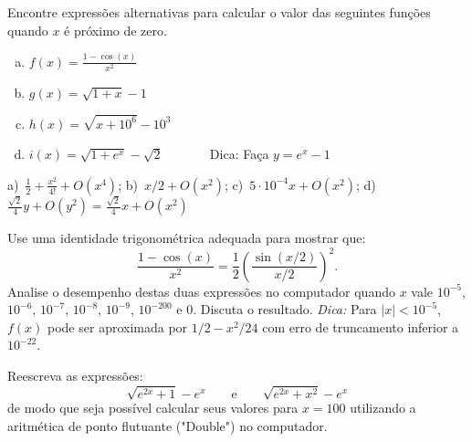 \begin{exer} Encontre expressões alternativas para calcular o valor das seguintes funções quando $x$ é próximo de zero.
\begin{enumerate}[a)]
\item $f(x)=\frac{1-\cos(x)}{x^2}$
\item $g(x)=\sqrt{1+x}-1$
\item $h(x)=\sqrt{x+10^6}-10^3$
\item $i(x)=\sqrt{1+e^{x}}-\sqrt{2}$ ~~~~~~ Dica: Faça $y=e^{x}-1$
\end{enumerate}
\end{exer}
\begin{resp}
    a)~$\frac{1}{2}+\frac{x^2}{4!}+O(x^4)$; b)~$x/2+O(x^2)$; c)~$5\cdot 10^{-4}x+O(x^2)$; d)~$\frac{\sqrt{2}}{4}y+O(y^{2})=\frac{\sqrt{2}}{4}x+O(x^2)$
\end{resp}

\begin{exer} Use uma identidade trigonométrica adequada para mostrar que:
  \begin{equation*}
    \frac{1-\cos(x)}{x^2}= \frac{1}{2} \left(\frac{\sin(x/2)}{x/2}\right)^2.
  \end{equation*}
Analise o desempenho destas duas expressões no computador quando $x$ vale $10^{-5}$, $10^{-6}$, $10^{-7}$, $10^{-8}$, $10^{-9}$, $10^{-200}$ e $0$. Discuta o resultado.
\emph{Dica:} Para $|x|<10^{-5}$, $f(x)$ pode ser aproximada por $1/2-x^2/24$ com erro de truncamento inferior a $10^{-22}$.
\end{exer}



\begin{exer} Reescreva as expressões:
  $$\sqrt{e^{2x}+1}-e^x \qquad\text{e}\qquad \sqrt{e^{2x}+x^2}-e^x $$
  de modo que seja possível calcular seus valores para $x=100$ utilizando a aritmética de ponto flutuante ("Double") no computador.
\end{exer}

